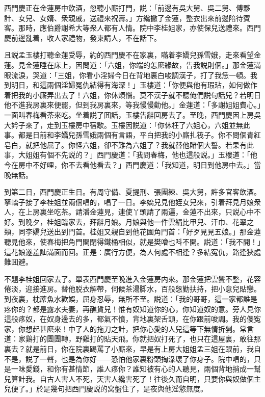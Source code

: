 西門慶正在金蓮房中飲酒，忽聽小廝打門，説：「前邊有吳大舅、吳二舅、傅夥計、女兒、女婿、衆親戚，送禮來祝壽。」方纔撇了金蓮，整衣出來前邊陪待賓客。那時，應伯爵謝希大等衆人都有人情。院中李桂姐家，亦使保兒送禮來。西門慶前邊亂着，收人家禮物，發柬請人，不在話下。

且説孟玉樓打聽金蓮受辱，約的西門慶不在家裏，瞞着李嬌兒孫雪娥，走來看望金蓮。見金蓮睡在床上，因問道：「六姐，你端的怎麽緣故，告我説則個。」那金蓮滿眼流淚，哭道：「三姐，你看小淫婦今日在背地裏白唆調漢子，打了我恁一頓。我到明日，和這兩個淫婦冤仇結得有海深！」玉樓道：「你便與他有瑕玷，如何做作着把我的小廝弄出去了！六姐，你休煩惱。莫不漢子就不聽俺們説句話兒？若明日他不進我房裏來便罷，但到我房裏來，等我慢慢勸他。」金蓮道：「多謝姐姐費心。」一面叫春梅看茶來吃。坐着説了囬話，玉樓告辭回房去了。至晚，西門慶因上房吳大妗子來了，走到玉樓房中宿歇。玉樓因説道：「你休枉了六姐心，六姐並無此事。都是日前和李嬌兒孫雪娥兩個有言語，平白把我的小廝扎筏子。你不問個青紅皂白，就把他屈了。你怪六姐，卻不難為六姐了？我就替他賭個大誓。若果有此事，大姐姐有個不先説的？」西門慶道：「我問春梅，他也這般説。」玉樓道：「他今在房中不好哩，你不去看他看去？」西門慶道：「我知道，明日到他房中去。」當晚無話。

到第二日，西門慶正生日。有周守備、夏提刑、張團練、吳大舅，許多官客飲酒。拏轎子接了李桂姐並兩個唱的，唱了一日。李嬌兒見他姪女兒來，引着拜見月娘衆人，在上房裏坐吃茶。請潘金蓮見，連使丫頭請了兩遍，金蓮不出來，只説心中不好。到晚夕，桂姐臨家去，拜辭月娘。月娘與他一件雲絹比甲兒、汗巾、花翠之類，同李嬌兒送出到門首。桂姐又親自到他花園角門首：「好歹見見五娘。」那金蓮聽見他來，使春梅把角門関閉得鐵桶相似，就是樊噲也呌不開。説道：「我不開！」這花娘遂羞訕滿面而回。正是：廣行方便，為人何處不相逢？多結寃仇，路逢狹處難囬避。

不題李桂姐回家去了。單表西門慶至晚進入金蓮房内來。那金蓮把雲鬢不整，花容倦淡，迎接進房。替他脱衣解帶，伺候茶湯脚水，百般慇勤扶持，把小意兒貼戀。到夜裏，枕蓆魚水歡娛，屈身忍辱，無所不至。説道：「我的哥哥，這一家都誰是疼你的？都是露水夫妻，再醮貨兒！惟有奴知道你的心，你知道奴的意。旁人見你這般疼奴，在奴身邊去的多，都氣不憤，背地裏架舌頭，在你跟前唆調。我的儍寃家，你想起甚麽來！中了人的拖刀之計，把你心愛的人兒這等下無情折剉。常言道：家鷄打的團團轉，野雞打的貼天飛。你就把奴打死了，也只在這屋裏，敢往那裏去？就是前日，你在院裏踢罵了小廝來，早是有上房大姐姐孟三姐在跟前，我自不是，説了一聲，也是為你好——恐怕他家裏粉頭掏淥壞了你身子。院中唱的，只是一味愛錢，和你有甚情節，誰人疼你？誰知被有心的人聽見，兩個背地捎成一幫兒算計我。自古人害人不死，天害人纔害死了！往後久而自明，只要你與奴做個主兒便了。」於是幾句把西門慶説的窝盤住了，是夜與他淫慾無度。

